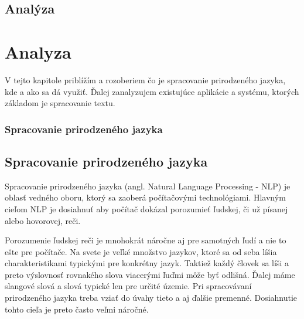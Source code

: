\newpage
{}
{
	\section{Analýza} 
}
{
	\chapter{Analyza}
}
V tejto kapitole priblížím a rozoberiem čo je spracovanie prirodzeného jazyka, kde a ako sa dá využiť. Ďalej zanalyzujem existujúce aplikácie a systému, ktorých základom je spracovanie textu.
{
	\subsection{Spracovanie prirodzeného jazyka}
}
{
	\section{Spracovanie prirodzeného jazyka}
}
\label{subsec:nlp}
Spracovanie prirodzeného jazyka (angl. Natural Language Processing - NLP) je oblasť vedného oboru, ktorý sa zaoberá počítačovými technológiami. Hlavným cieľom NLP je dosiahnuť aby počítač dokázal porozumieť ľudskej, či už písanej alebo hovorovej, reči.

Porozumenie ľudskej reči je mnohokrát náročne aj pre samotných ľudí a nie to ešte pre počítače. Na svete je veľké množstvo jazykov, ktoré sa od seba líšia charakteristikami typickými pre konkrétny jazyk. Taktiež každý človek sa líši a preto výslovnosť rovnakého slova viacerými ľuďmi môže byť odlišná. Ďalej máme slangové slová a slová typické len pre určité územie. Pri spracovávaní prirodzeného jazyka treba vziať do úvahy tieto a aj ďalšie premenné. Dosiahnutie tohto cieľa je preto často veľmi náročné.

